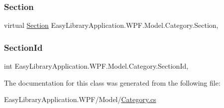 \subsubsection{\texorpdfstring{Section}{Section}}
{\footnotesize\ttfamily virtual \mbox{\hyperlink{class_easy_library_application_1_1_w_p_f_1_1_model_1_1_section}{Section}} Easy\+Library\+Application.\+W\+P\+F.\+Model.\+Category.\+Section\hspace{0.3cm}{\ttfamily [get]}, {\ttfamily [set]}}

\mbox{\label{class_easy_library_application_1_1_w_p_f_1_1_model_1_1_category_a00384f75a427ca2e8864f3886da31af7}} 
\subsubsection{\texorpdfstring{Section\+Id}{SectionId}}
{\footnotesize\ttfamily int Easy\+Library\+Application.\+W\+P\+F.\+Model.\+Category.\+Section\+Id\hspace{0.3cm}{\ttfamily [get]}, {\ttfamily [set]}}



The documentation for this class was generated from the following file\+:\begin{DoxyCompactItemize}
\item 
Easy\+Library\+Application.\+W\+P\+F/\+Model/\mbox{\hyperlink{_category_8cs}{Category.\+cs}}\end{DoxyCompactItemize}
